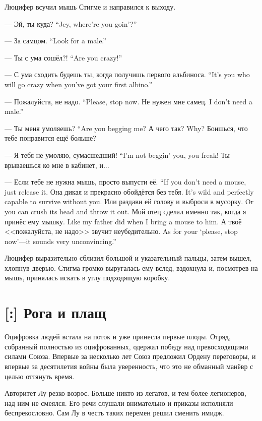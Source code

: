 Люцифер всучил мышь Стигме и направился к выходу.

{--- Эй, ты куда?}
{``Jey, where're you goin'?''}

{--- За самцом.}
{``Look for a male.''}

{--- Ты с ума сошёл?!}
{``Are you crazy!''}

{--- С ума сходить будешь ты, когда получишь первого альбиноса.}
{``It's you who will go crazy when you've got your first albino.''}

{--- Пожалуйста, не надо.}
{``Please, stop now.}
{Не нужен мне самец.}
{I don't need a male.''}

{--- Ты меня умоляешь?}
{``Are you begging me?}
{А чего так?}
{Why?}
Боишься, что тебе понравится ещё больше?

{--- Я тебя не умоляю, сумасшедший!}
{``I'm not beggin' you, you freak!}
Ты врываешься ко мне в кабинет, и...

{--- Если тебе не нужна мышь, просто выпусти её.}
{``If you don't need a mouse, just release it.}
{Она дикая и прекрасно обойдётся без тебя.}
{It's wild and perfectly capable to survive without you.}
{Или раздави ей голову и выброси в мусорку.}
{Or you can crush its head and throw it out.}
{Мой отец сделал именно так, когда я принёс ему мышку.}
{Like my father did when I bring a mouse to him.}
{А твоё <<пожалуйста, не надо>> звучит неубедительно.}
{As for your `please, stop now'---it sounds very unconvincing.''}

Люцифер выразительно сблизил большой и указательный пальцы, затем вышел, хлопнув дверью.
Стигма громко выругалась ему вслед, вздохнула и, посмотрев на мышь, принялась искать в углу подходящую коробку.

\section{[:] Рога и плащ}

Оцифровка людей встала на поток и уже принесла первые плоды.
Отряд, собранный полностью из оцифрованных, одержал победу над превосходящими силами Союза.
Впервые за несколько лет Союз предложил Ордену переговоры, и впервые за десятилетия войны была уверенность, что это не обманный манёвр с целью оттянуть время.

Авторитет Лу резко возрос.
Больше никто из легатов, и тем более легионеров, над ним не смеялся.
Его речи слушали внимательно и приказы исполняли беспрекословно.
Сам Лу в честь таких перемен решил сменить имидж.


